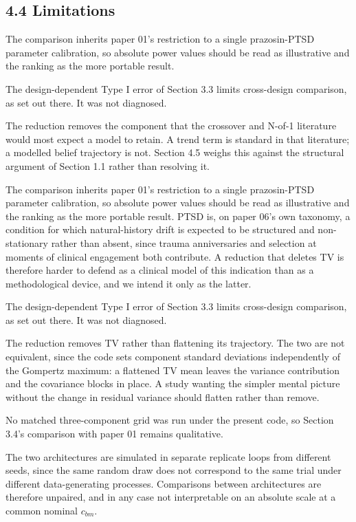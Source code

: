 \documentclass[
  11pt,
]{article}
\begin{document}
\subsection{4.4 Limitations}

The comparison inherits paper 01's restriction to a single
prazosin-PTSD parameter calibration, so absolute power values should
be read as illustrative and the ranking as the more portable result.

The design-dependent Type I error of Section 3.3 limits cross-design
comparison, as set out there. It was not diagnosed.

The reduction removes the component that the crossover and N-of-1
literature would most expect a model to retain. A trend term is
standard in that literature; a modelled belief trajectory is not.
Section 4.5 weighs this against the structural argument of Section
1.1 rather than resolving it.

The comparison inherits paper 01's restriction to a single
prazosin-PTSD parameter calibration, so absolute power values should
be read as illustrative and the ranking as the more portable result.
PTSD is, on paper 06's own taxonomy, a condition for which
natural-history drift is expected to be structured and non-stationary
rather than absent, since trauma anniversaries and selection at
moments of clinical engagement both contribute. A reduction that
deletes TV is therefore harder to defend as a clinical model of this
indication than as a methodological device, and we intend it only as
the latter.

The design-dependent Type I error of Section 3.3 limits cross-design
comparison, as set out there. It was not diagnosed.

The reduction removes TV rather than flattening its trajectory. The
two are not equivalent, since the code sets component standard
deviations independently of the Gompertz maximum: a flattened TV mean
leaves the variance contribution and the covariance blocks in place.
A study wanting the simpler mental picture without the change in
residual variance should flatten rather than remove.

No matched three-component grid was run under the present code, so
Section 3.4's comparison with paper 01 remains qualitative.

The two architectures are simulated in separate replicate loops from
different seeds, since the same random draw does not correspond to
the same trial under different data-generating processes. Comparisons
between architectures are therefore unpaired, and in any case not
interpretable on an absolute scale at a common nominal \(c_{bm}\).
\end{document}
